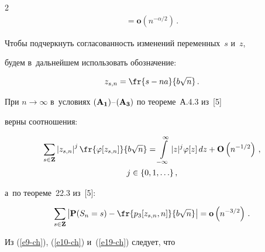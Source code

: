 \begin{multicols}{2}
\begin{multline}
  {}=\mathbf{o}\left(n^{-\alpha/2}\right)\,.


  \label{e18-ch}


 \end{multline}





 Чтобы подчеркнуть согласованность изменений переменных~$s$ и~$z$, 


 будем в~дальнейшем использовать обозначение:


 \begin{equation*}


 z_{s,n}=\fr{s-na}{b\sqrt{n}}\,.


 \end{equation*}





 При  $n\to\infty$ в~условиях ${\bf (A_1)}$--${\bf(A_3)}$ по теореме~А.4.3 из~[5]


 верны соотношения:


 \begin{multline}


 \sum\limits_{s\in \mathbf{Z}} 


 \left|z_{s,n}\right|^j \fr{\varphi[z_{s,n}]}{b\sqrt{n}}=


  \int\limits_{-\infty}^{\infty} |z|^j \varphi[z]\, dz+


\mathbf{O}


 \left(n^{-1/2}\right)\,,\\ j\in\{0,1,\ldots\}\,,


 \label{e19-ch}


 \end{multline}


 а~по теореме~22.3 из~[5]:


 \begin{equation}


 \sum\limits_{s\in \mathbf{Z}} \left|


 \mathbf{P}(S_n=s)-\fr{p_3[z_{s,n},n]}{b\sqrt{n}}\right|


 =\mathbf{o}\left(n^{-3/2}\right)\,.


 \label{e20-ch}


 \end{equation}





 Из (\ref{e9-ch}), (\ref{e10-ch}) и~(\ref{e19-ch}) следует, что


 \begin{multline*}



\end{multline*}
\end{multicols}
